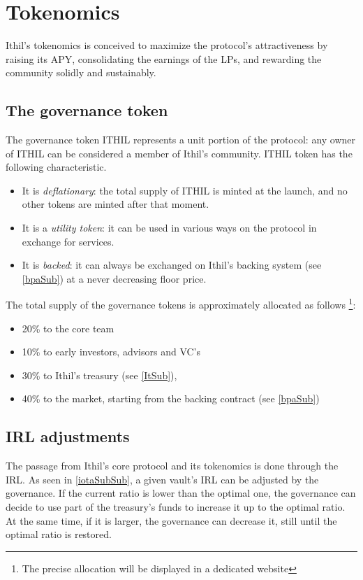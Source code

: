 \documentclass[a4paper,10 pt]{article}
\theoremstyle{definition}
\begin{document}
\section{Tokenomics}\label{tokSec}
Ithil's tokenomics is conceived to maximize the protocol's attractiveness by raising its APY, consolidating the earnings of the LPs, and rewarding the community solidly and sustainably.

\subsection{The governance token}\label{govSub}
The governance token ITHIL represents a unit portion of the protocol: any owner of ITHIL can be considered a member of Ithil's community. ITHIL token has the following characteristic.
\begin{itemize}
\item It is {\it deflationary}: the total supply of ITHIL is minted at the launch, and no other tokens are minted after that moment.
\item It is a {\it utility token}: it can be used in various ways on the protocol in exchange for services.
\item It is {\it backed}: it can always be exchanged on Ithil's backing system (see \ref{bpaSub}) at a never decreasing floor price.
\end{itemize}

The total supply of the governance tokens is approximately allocated as follows  \footnote{The precise allocation will be displayed in a dedicated website}:
\begin{itemize}
\item 20\% to the core team
\item 10\% to early investors, advisors and VC's
\item 30\% to Ithil's treasury (see \ref{ItSub}), 
\item 40\% to the market, starting from the backing contract (see \ref{bpaSub})
\end{itemize}

\subsection{IRL adjustments}\label{irladjSub}

The passage from Ithil's core protocol and its tokenomics is done through the IRL. As seen in \ref{iotaSubSub}, a given vault's IRL can be adjusted by the governance. If the current ratio is lower than the optimal one, the governance can decide to use part of the treasury's funds to increase it up to the optimal ratio. At the same time, if it is larger, the governance can decrease it, still until the optimal ratio is restored.
\end{document}
